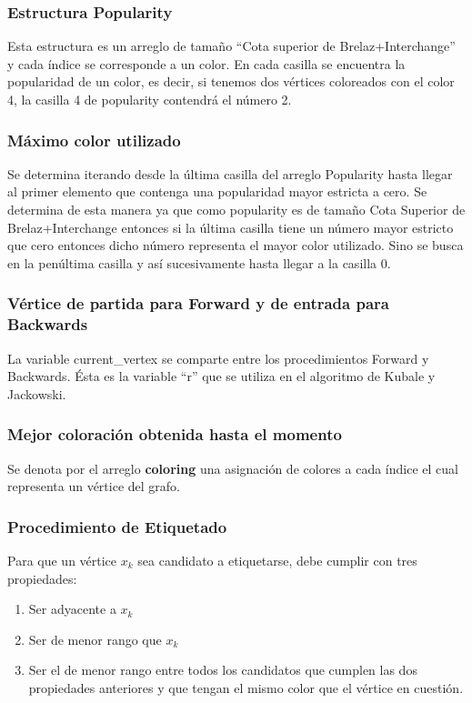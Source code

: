 \documentclass[a4paper,10pt]{article}
\begin{document}
\subsubsection{Estructura Popularity}
Esta estructura es un arreglo de tamaño ``Cota superior de Brelaz+Interchange'' y cada índice 
se corresponde a un color. En cada casilla se encuentra la popularidad de un color, es decir, 
si tenemos dos vértices coloreados con el color 4, la casilla 4 de popularity contendrá el número 2.

\subsubsection{Máximo color utilizado}

Se determina iterando desde la última casilla del arreglo Popularity hasta llegar al primer 
elemento que contenga una popularidad mayor estricta a cero. Se determina de esta manera ya que 
como popularity es de tamaño Cota Superior de Brelaz+Interchange entonces si la última casilla 
tiene un número mayor estricto que cero entonces dicho número representa el mayor color utilizado. 
Sino se busca en la penúltima casilla y así sucesivamente hasta llegar a la casilla 0.

\subsubsection{Vértice de partida para Forward y de entrada para Backwards}

La variable current_vertex se comparte entre los procedimientos Forward y Backwards. 
Ésta es la variable ``r'' que se utiliza en el algoritmo de Kubale y Jackowski. 

\subsubsection{Mejor coloración obtenida hasta el momento}

Se denota por el arreglo \textbf{coloring} una asignación de colores a cada índice 
el cual representa un vértice del grafo.

\subsubsection{Procedimiento de Etiquetado}

Para que un vértice $x_{k}$ sea candidato a etiquetarse, debe cumplir con tres propiedades:

\begin{enumerate}
 \item Ser adyacente a $x_{k}$
 \item Ser de menor rango que $x_{k}$
 \item Ser el de menor rango entre todos los candidatos que cumplen 
       las dos propiedades anteriores y que tengan el mismo color 
	que el vértice en cuestión.
\end{enumerate}
\end{document}
